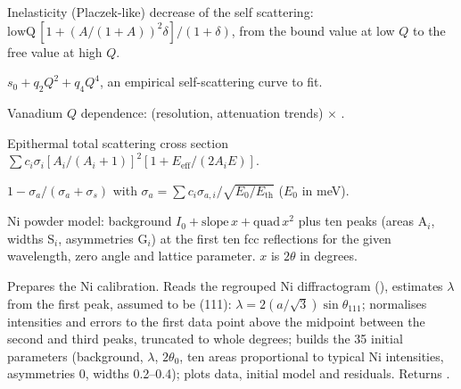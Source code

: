 \documentclass[11pt,a4paper]{article}
\begin{document}

Inelasticity (Placzek-like) decrease of the self scattering:
$\mathrm{lowQ}\,[1+(A/(1+A))^2\delta]/(1+\delta)$, from the bound value at
low $Q$ to the free value at high $Q$.

$s_0 + q_2Q^2 + q_4Q^4$, an empirical self-scattering curve to fit.

Vanadium $Q$ dependence:  (resolution, attenuation trends)
$\times$ .

Epithermal total scattering cross section
$\sum c_i\sigma_i[A_i/(A_i+1)]^2[1+E_\mathrm{eff}/(2A_iE)]$.

$1-\sigma_a/(\sigma_a+\sigma_s)$ with $\sigma_a = \sum c_i\sigma_{a,i}/\sqrt{E_0/E_\mathrm{th}}$ ($E_0$ in meV).

Ni powder model: background $I_0 + \mathrm{slope}\,x + \mathrm{quad}\,x^2$
plus ten  peaks (areas A$_i$, widths S$_i$, asymmetries
G$_i$) at the first ten fcc reflections for the given wavelength, zero
angle and lattice parameter. $x$ is $2\theta$ in degrees.


Prepares the Ni calibration. Reads the regrouped Ni diffractogram
(), estimates $\lambda$ from the first peak, assumed to be
(111): $\lambda = 2(a/\sqrt3)\sin\theta_{111}$; normalises intensities and
errors to the first data point above the midpoint between the second and
third peaks, truncated to whole degrees; builds the
35 initial parameters (background, $\lambda$, $2\theta_0$, ten areas
proportional to typical Ni intensities, asymmetries 0, widths 0.2--0.4);
plots data, initial model and residuals. Returns
.
\end{document}
